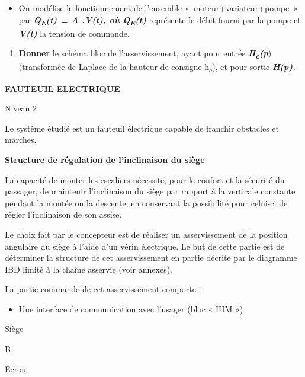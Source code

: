 \begin{itemize}
\item
  On modélise le fonctionnement de l'ensemble «~moteur+variateur+pompe~»
  par \emph{\textbf{Q\textsubscript{E}(t) = A .V(t), où
  Q\textsubscript{E}(t)}} représente le débit fourni par la pompe et
  \emph{\textbf{V(t)}} la tension de commande.
\end{itemize}

\begin{enumerate}
\def\labelenumi{\arabic{enumi}.}
\setcounter{enumi}{3}
\item
  \textbf{Donner} le schéma bloc de l'asservissement, ayant pour entrée
  \emph{\textbf{H\textsubscript{c}(p}}) (transformée de Laplace de la
  hauteur de consigne h\textsubscript{c}), et pour sortie
  \emph{\textbf{H(p).}}
\end{enumerate}

\emph{\hfill\break
}

\textbf{FAUTEUIL ELECTRIQUE}

Niveau 2


Le système étudié est un fauteuil électrique capable de franchir
obstacles et marches.

\textbf{Structure de régulation de l'inclinaison du siège}

La capacité de monter les escaliers nécessite, pour le confort et la
sécurité du passager, de maintenir l'inclinaison du siège par rapport à
la verticale constante pendant la montée ou la descente, en conservant
la possibilité pour celui-ci de régler l'inclinaison de son assise.

Le choix fait par le concepteur est de réaliser un asservissement de la
position angulaire du siège à l'aide d'un vérin électrique. Le but de
cette partie est de déterminer la structure de cet asservissement en
partie décrite par le diagramme IBD limité à la chaîne asservie (voir
annexes).

\ul{La partie commande} de cet asservissement comporte :

\begin{itemize}
\item
  Une interface de communication avec l'usager (bloc « IHM »)
\end{itemize}

Siège

B

Ecrou

